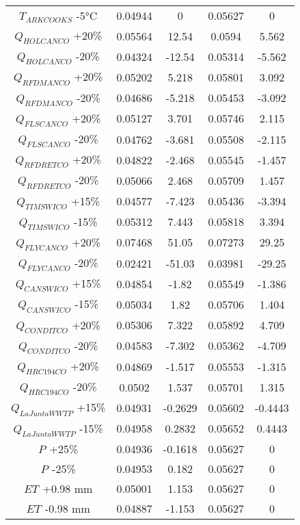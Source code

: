 \begin{linenumbers}
\begin{spacing}{1.0}
\begin{center}
\begin{longtable}{c|cc|cc}
	$T_{ARKCOOKS}$ -5\si{\degreeCelsius}&	0.04944&	0&	0.05627&	0\\               
	$Q_{HOLCANCO}$ +20\%&					0.05564&	12.54&	0.0594&	5.562\\           
	$Q_{HOLCANCO}$ -20\%&					0.04324&	-12.54&	0.05314&	-5.562\\      
	$Q_{RFDMANCO}$ +20\%&					0.05202&	5.218&	0.05801&	3.092\\       
	$Q_{RFDMANCO}$ -20\%&					0.04686&	-5.218&	0.05453&	-3.092\\      
	$Q_{FLSCANCO}$ +20\%&					0.05127&	3.701&	0.05746&	2.115\\       
	$Q_{FLSCANCO}$ -20\%&					0.04762&	-3.681&	0.05508&	-2.115\\      
	$Q_{RFDRETCO}$ +20\%&					0.04822&	-2.468&	0.05545&	-1.457\\      
	$Q_{RFDRETCO}$ -20\%&					0.05066&	2.468&	0.05709&	1.457\\       
	$Q_{TIMSWICO}$ +15\%&					0.04577&	-7.423&	0.05436&	-3.394\\      
	$Q_{TIMSWICO}$ -15\%&					0.05312&	7.443&	0.05818&	3.394\\       
	$Q_{FLYCANCO}$ +20\%&					0.07468&	51.05&	0.07273&	29.25\\       
	$Q_{FLYCANCO}$ -20\%&					0.02421&	-51.03&	0.03981&	-29.25\\      
	$Q_{CANSWICO}$ +15\%&					0.04854&	-1.82&	0.05549&	-1.386\\      
	$Q_{CANSWICO}$ -15\%&					0.05034&	1.82&	0.05706&	1.404\\       
	$Q_{CONDITCO}$ +20\%&					0.05306&	7.322&	0.05892&	4.709\\       
	$Q_{CONDITCO}$ -20\%&					0.04583&	-7.302&	0.05362&	-4.709\\      
	$Q_{HRC194CO}$ +20\%&					0.04869&	-1.517&	0.05553&	-1.315\\      
	$Q_{HRC194CO}$ -20\%&					0.0502&	1.537&	0.05701&	1.315\\           
	$Q_{La Junta WWTP}$ +15\%&				0.04931&	-0.2629&	0.05602&	-0.4443\\ 
	$Q_{La Junta WWTP}$ -15\%&				0.04958&	0.2832&	0.05652&	0.4443\\      
	$P_{}$ +25\%&							0.04936&	-0.1618&	0.05627&	0\\       
	$P_{}$ -25\%&							0.04953&	0.182&	0.05627&	0\\           
	$ET_{}$ +0.98 mm&						0.05001&	1.153&	0.05627&	0\\           
	$ET_{}$ -0.98 mm&						0.04887&	-1.153&	0.05627&	0\\           

\end{longtable}
\end{center}
\end{spacing}
\end{linenumbers}
